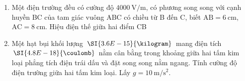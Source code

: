 \begin{enumerate}[label=\bfseries Câu \arabic*:, leftmargin=1.0cm]
\item Một điện trường đều có cường độ $\SI{4000}{\volt/\meter}$, có phương song song với cạnh huyền BC của tam giác vuông ABC có chiều từ B đến C, biết $\text{AB}=\SI{6}{\centi\meter}$, $\text{AC}=\SI{8}{\centi\meter}$. Hiệu điện thế giữa hai điểm CB

\item Một hạt bụi khối lượng $\SI{3.6E-15}{\kilogram}$ mang điện tích $\SI{4.8E-18}{\coulomb}$ nằm cân bằng trong khoảng giữa hai tấm kim loại phẳng tích điện trái dấu và đặt song song nằm ngang. Tính cường độ điện trường giữa hai tấm kim loại. Lấy $g=\SI{10}{\meter/\second^2}$.


\end{enumerate}
